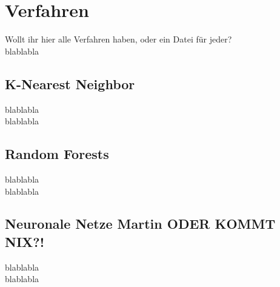
\chapter{Verfahren} %
\label{cha:Verfahren}

Wollt ihr hier alle Verfahren haben, oder ein Datei für jeder?\\

blablabla


\section{K-Nearest Neighbor} %
\label{sec:KNN}
blablabla\\

blablabla

\section{Random Forests} %
\label{sec:Forests}
blablabla\\

blablabla

\section{Neuronale Netze Martin ODER KOMMT NIX?!} %
\label{sec:NN1}
blablabla\\

blablabla

